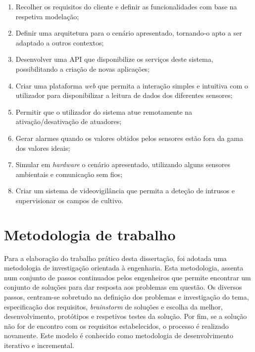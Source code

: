 \begin{enumerate}

	\item Recolher os requisitos do cliente e definir as funcionalidades com base na respetiva modelação; 
	
	\item Definir uma arquitetura para o cenário apresentado, tornando-o apto a ser adaptado a outros contextos; 
	
	\item Desenvolver uma \ac{API} que disponibilize os serviços deste sistema, possibilitando a criação de novas aplicações;   
	
	\item Criar uma plataforma \textit{web} que permita a  interação simples e intuitiva com o utilizador para disponibilizar a leitura de dados dos diferentes sensores; 
	
	\item Permitir que o utilizador do sistema atue remotamente na ativação/desativação de atuadores; 
	
	
	\item Gerar alarmes quando os valores obtidos pelos sensores estão fora da gama dos valores ideais; 
	
	\item Simular em \textit{hardware} o cenário apresentado, utilizando alguns sensores ambientais e comunicação sem fios; 
	
	\item Criar um sistema de videovigilância que permita a deteção de intrusos e supervisionar os campos de cultivo. 

\end{enumerate}










\section{Metodologia de trabalho}
\label{method}


Para a elaboração do trabalho prático desta dissertação, foi adotada uma metodologia de investigação orientada à engenharia. Esta metodologia, assenta num conjunto de passos continuados pelos engenheiros que permite encontrar um conjunto de soluções para dar resposta aos problemas em questão. Os diversos passos, centram-se sobretudo na definição dos problemas e investigação do tema, especificação dos requisitos, \textit{brainstorm} de soluções e escolha da melhor, desenvolvimento, protótipos e respetivos testes da solução. Por fim, se a solução não for de encontro com os requisitos estabelecidos, o processo é realizado novamente\cite{desingprocess}. Este modelo é conhecido como metodologia de desenvolvimento iterativo e incremental. 


